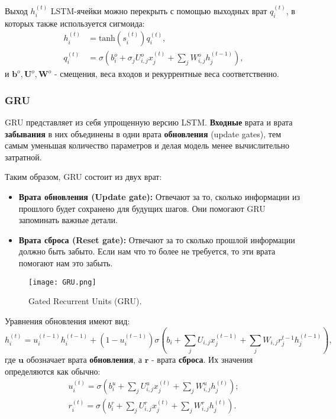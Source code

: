 Выход $h_i^{(t)}$ LSTM-ячейки можно перекрыть с помощью выходных врат 
$q_i^{(t)}$, в которых также используется сигмоида:
\begin{align*}
    h_i^{(t)} &= \text{tanh}(s_i^{(t)})q_i^{(t)}, \\[0.5em]
    q_i^{(t)} &= \sigma \left( 
        b_i^o + \sigma_j U_{i,j}^o x_j^{(t)} + \sum_j W_{i,j}^o h_j^{(t-1)}
    \right),
\end{align*}
и $\bm{b}^o, \bm{U}^o, \bm{W}^o$ - смещения, веса входов и рекуррентные веса соответственно.

\subsubsection{GRU}

GRU представляет из себя упрощенную версию LSTM. \textbf{Входные} врата и врата 
\textbf{забывания} в них объединены в одни врата \textbf{обновления} (update gates), 
тем самым уменьшая количество параметров и делая модель менее вычислительно затратной.

Таким образом, GRU состоит из двух врат:
\begin{itemize}
    \item \textbf{Врата обновления (Update gate):} Отвечают за то, сколько информации из прошлого будет сохранено для будущих шагов. Они помогают GRU запоминать важные детали.
    \item \textbf{Врата сброса (Reset gate):} Отвечают за то сколько прошлой информации должно быть забыто. Если нам что то более не требуется, то эти врата помогают нам это забыть.
\end{itemize}

\begin{figure}[h!]
    \centering
    \texttt{[image: GRU.png]}
    \caption{Gated Recurrent Units (GRU).}
    \label{fig:GRU}
\end{figure}

Уравнения обновления имеют вид:
\begin{equation*}
    h_i^{(t)} = u_i^{(t-1)} h_i^{(t-1)} + (1-u_i^{(t-1)}) \sigma \left( 
        b_i + \sum_j U_{i,j} x_j^{(t-1)} + \sum_j W_{i,j} r_j^{t-1} h_j^{(t-1)}
    \right),
\end{equation*}
где $\bm{u}$ обозначает врата \textbf{обновления}, а $\bm{r}$ - врата \textbf{сброса}. 
Их значения определяются как обычно:
\begin{gather*}
    u_i^{(t)} = \sigma \left(
        b_i^u + \sum_j U_{i,j}^u x_j^{(t)} + \sum_j W_{i,j}^u h_j^{(t)}
    \right); \\[0.5em]
    r_i^{(t)} = \sigma \left(
        b_i^r + \sum_j U_{i,j}^r x_j^{(t)} + \sum_j W_{i,j}^r h_j^{(t)}
    \right).
\end{gather*}

